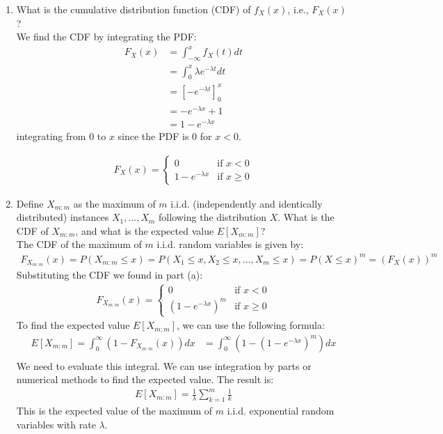 \documentclass[a3paper,12pt]{extarticle} %
\begin{document}
\begin{enumerate}
\item
What is the cumulative distribution function (CDF) of $f_X(x)$, i.e., $F_X(x)$?
\\ We find the CDF by integrating the PDF:
\begin{align}
F_X(x) &= \int_{-\infty}^x f_X(t) dt\\
&= \int_{0}^x \lambda e^{-\lambda t} dt\\
&= \left[-e^{-\lambda t}\right]_{0}^x\\
&= -e^{-\lambda x} + 1\\
&= 1 - e^{-\lambda x}
\end{align}
integrating from $0$ to $x$ since the PDF is $0$ for $x < 0$.

\begin{align}
F_X(x) =
\begin{cases}
0 & \text{if } x < 0\\
1 - e^{-\lambda x} & \text{if } x \geq 0
\end{cases}
\end{align}

\item
Define $X_{m:m}$ as the maximum of $m$ i.i.d. (independently and identically distributed) instances $X_1, ..., X_m$ following the distribution $X$. What is the CDF of $X_{m:m}$, and what is the expected value $E[X_{m:m}]$?
\\ The CDF of the maximum of $m$ i.i.d. random variables is given by:
\begin{align}
F_{X_{m:m}}(x) = P(X_{m:m} \leq x) = P(X_1 \leq x, X_2 \leq x, ..., X_m \leq x) = P(X \leq x)^m = (F_X(x))^m
\end{align}
Substituting the CDF we found in part (a):
\begin{align}
F_{X_{m:m}}(x) =
\begin{cases}
0 & \text{if } x < 0\\
(1 - e^{-\lambda x})^m & \text{if } x \geq 0
\end{cases}
\end{align}
To find the expected value $E[X_{m:m}]$, we can use the following formula:
\begin{align}
E[X_{m:m}] = \int_0^\infty (1 - F_{X_{m:m}}(x)) dx
&= \int_0^\infty (1 - (1 - e^{-\lambda x})^m) dx\\
\end{align}
We need to evaluate this integral. We can use integration by parts or numerical methods to find the expected value. The result is:
\begin{align}
E[X_{m:m}] = \frac{1}{\lambda} \sum_{k=1}^m \frac{1}{k}
\end{align}
This is the expected value of the maximum of $m$ i.i.d. exponential random variables with rate $\lambda$.



\end{enumerate}
\end{document}
